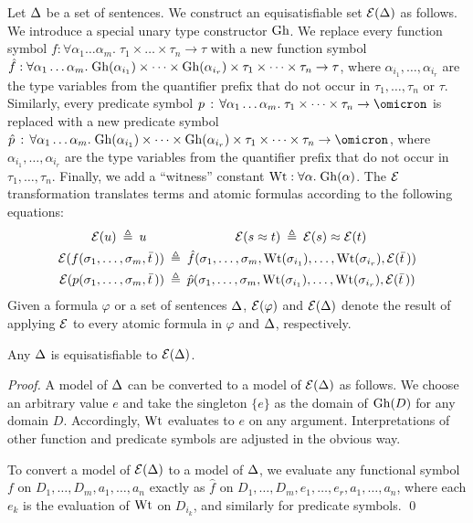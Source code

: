 
Let $\mathrm{\Delta}$ be a set of sentences.
We construct an equisatisfiable set $\mathcal{E}(\mathrm{\Delta})$ as follows.
%
We introduce a special unary type constructor $\mathrm{Gh}$.
We replace every function symbol $f : \forall \alpha_1\dots\alpha_m .\; \tau_1 \times \dots \times \tau_n \to \tau$
with a new function symbol $\hat{f} : \forall \alpha_1\dots\alpha_m .\;
\mathrm{Gh}(\alpha_{i_1}) \times \dots \times \mathrm{Gh}(\alpha_{i_r}) \times
\tau_1 \times \dots \times \tau_n \to \tau$,
where $\alpha_{i_1},\dots,\alpha_{i_r}$ are the type
variables from the quantifier prefix that do not occur in
$\tau_1,\dots,\tau_n$ or $\tau$.
Similarly, every predicate symbol $p \,\ty\,
\forall \alpha_1\dots\alpha_m .\;\allowbreak \tau_1 \times \dots \times \tau_n \to \omicron$
is replaced with a new predicate symbol $\hat{p} \,\ty\,
\forall \alpha_1\dots\alpha_m .\;\allowbreak
\ghost(\alpha_{i_1}) \times \dots \times \ghost(\alpha_{i_r}) \times
\tau_1 \times \dots \times \tau_n \to \omicron$,
where $\alpha_{i_1},\dots,\alpha_{i_r}$ are the type
variables from the quantifier prefix that do not occur in
$\tau_1,\dots,\tau_n$.
Finally, we add a ``witness'' constant $\mathrm{Wt} : \forall \alpha.\;\mathrm{Gh}(\alpha)$.
The $\mathcal{E}$ transformation translates terms and atomic
formulas according to the following equations:
\begin{align*}
\ELI(u) \eqdef u
\kern1.4em & \kern5.55em %
\ELI(s \eq t) \eqdef \ELI(s) \eq \ELI(t) \\
\ELI(f(\sigma_1,\dots,\sigma_m,\bar t\,)) &\eqdef
\hat{f}(\sigma_1,\dots,\sigma_m,\wit(\sigma_{i_1}),\dots,\wit(\sigma_{i_r}),
\ELI(\bar t\,)) \\
\ELI(p(\sigma_1,\dots,\sigma_m,\bar t\,)) &\eqdef
\hat{p}(\sigma_1,\dots,\sigma_m,\wit(\sigma_{i_1}),\dots,\wit(\sigma_{i_r}),
\ELI(\bar t\,))
\end{align*}
Given a formula $\varphi$ or a set of sentences $\mathrm{\Delta}$,
$\mathcal{E}(\varphi)$ and $\mathcal{E}(\mathrm{\Delta})$ denote the result of
applying $\mathcal{E}$ to every atomic formula in $\varphi$ and
$\mathrm{\Delta}$, respectively.

\begin{theorem} \label{thm:eli}
Any $\mathrm{\Delta}$ is equisatisfiable to $\mathcal{E}(\mathrm{\Delta})$.
\end{theorem}
\begin{proof}
A model of $\mathrm{\Delta}$ can be converted to a model of $\mathcal{E}(\mathrm{\Delta})$
as follows. We choose an arbitrary value $e$ and take the singleton
$\{ e \}$ as the domain of $\mathrm{Gh}(D)$ for any domain $D$.
Accordingly, $\mathrm{Wt}$ evaluates to $e$ on any argument.
Interpretations of other function and predicate symbols are
adjusted in the obvious way.

To convert a model of $\mathcal{E}(\mathrm{\Delta})$
to a model of $\mathrm{\Delta}$, we evaluate any functional symbol
$f$ on $D_1,\dots,D_m,a_1,\dots,a_n$ exactly as
$\hat{f}$ on $D_1,\dots,D_m,e_1,\dots,e_r,a_1,\dots,a_n$,
where each $e_k$ is the evaluation of $\mathrm{Wt}$ on $D_{i_k}$, and similarly
for predicate symbols.
\qed
\end{proof}

